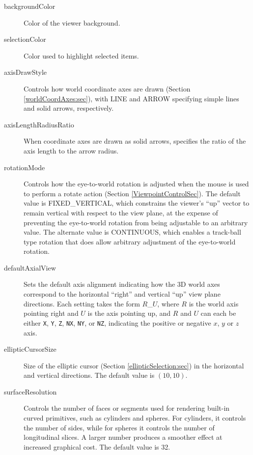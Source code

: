 \documentclass{article}
\begin{document}
\begin{description}

\item[backgroundColor]\mbox{}

Color of the viewer background.

\item[selectionColor]\mbox{}

Color used to highlight selected items.

\item[axisDrawStyle]\mbox{}

Controls how world coordinate axes are drawn (Section
\ref{worldCoordAxes:sec}), with {\sf LINE} and {\sf ARROW} specifying
simple lines and solid arrows, respectively.

\item[axisLengthRadiusRatio]\mbox{}

When coordinate axes are drawn as solid arrows, specifies the ratio of
the axis length to the arrow radius.

\item[rotationMode]\mbox{}

Controls how the eye-to-world rotation is adjusted when the mouse is
used to perform a rotate action (Section \ref{ViewpointControlSec}).
The default value is {\sf FIXED\_VERTICAL}, which constrains the
viewer's ``up'' vector to remain vertical with respect to the view
plane, at the expense of preventing the eye-to-world rotation from
being adjustable to an arbitrary value. The alternate value is {\sf
CONTINUOUS}, which enables a track-ball type rotation that does allow
arbitrary adjustment of the eye-to-world rotation.

\item[defaultAxialView]\mbox{}

Sets the default axis alignment indicating how the 3D world axes
correspond to the horizontal ``right'' and vertical ``up'' view plane
directions.  Each setting takes the form $R$\_$U$, where $R$ is the
world axis pointing right and $U$ is the axis pointing up, and $R$ and
$U$ can each be either {\tt X}, {\tt Y}, {\tt Z}, {\tt NX}, {\tt NY},
or {\tt NZ}, indicating the positive or negative $x$, $y$ or $z$ axis.

\item[ellipticCursorSize]\mbox{}

Size of the elliptic cursor (Section \ref{ellipticSelection:sec}) in
the horizontal and vertical directions. The default value is
$(10, 10)$.

\item[surfaceResolution]\mbox{}

Controls the number of faces or segments used for
rendering built-in curved primitives, such as cylinders and
spheres. For cylinders, it controls the number of sides, while for
spheres it controls the number of longitudinal slices. A larger number
produces a smoother effect at increased graphical cost. The default
value is 32.

\end{description}
\end{document}
